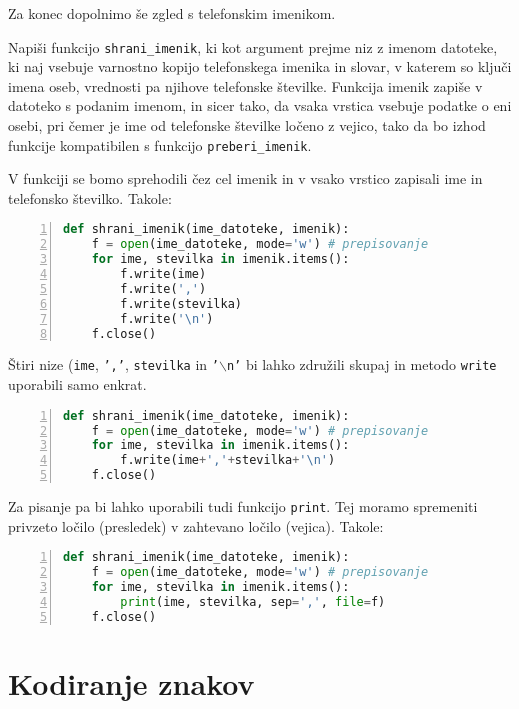 Za konec dopolnimo še zgled s telefonskim imenikom.
\begin{zgled}
Napiši funkcijo \texttt{shrani\_imenik}, ki kot argument prejme niz z imenom datoteke, ki naj vsebuje varnostno kopijo telefonskega imenika in slovar, v katerem so ključi imena oseb, vrednosti pa njihove telefonske številke. Funkcija imenik zapiše v datoteko s podanim imenom, in sicer tako, da vsaka vrstica vsebuje podatke o eni osebi, pri čemer je ime od telefonske številke ločeno z vejico, tako da bo izhod funkcije kompatibilen s funkcijo \texttt{preberi\_imenik}.
\end{zgled}
\begin{resitev}
V funkciji se bomo sprehodili čez cel imenik in v vsako vrstico zapisali ime in telefonsko številko. Takole:
\begin{lstlisting}[language=Python, showstringspaces=false,numbers=left]
def shrani_imenik(ime_datoteke, imenik):
    f = open(ime_datoteke, mode='w') # prepisovanje
    for ime, stevilka in imenik.items():
        f.write(ime) 
        f.write(',')
        f.write(stevilka)
        f.write('\n')
    f.close()
\end{lstlisting}
Štiri nize (\texttt{ime}, \texttt{','}, \texttt{stevilka} in \texttt{'$\backslash$n'} bi lahko združili skupaj in metodo \texttt{write} uporabili samo enkrat.
\begin{lstlisting}[language=Python, showstringspaces=false,numbers=left]
def shrani_imenik(ime_datoteke, imenik):
    f = open(ime_datoteke, mode='w') # prepisovanje
    for ime, stevilka in imenik.items():
        f.write(ime+','+stevilka+'\n')
    f.close()
\end{lstlisting}
Za pisanje pa bi lahko uporabili tudi funkcijo \texttt{print}. Tej moramo spremeniti privzeto ločilo (presledek) v zahtevano ločilo (vejica). Takole:
\begin{lstlisting}[language=Python, showstringspaces=false,numbers=left]
def shrani_imenik(ime_datoteke, imenik):
    f = open(ime_datoteke, mode='w') # prepisovanje
    for ime, stevilka in imenik.items():
        print(ime, stevilka, sep=',', file=f)
    f.close()
\end{lstlisting}
\end{resitev}

\section{Kodiranje znakov}

